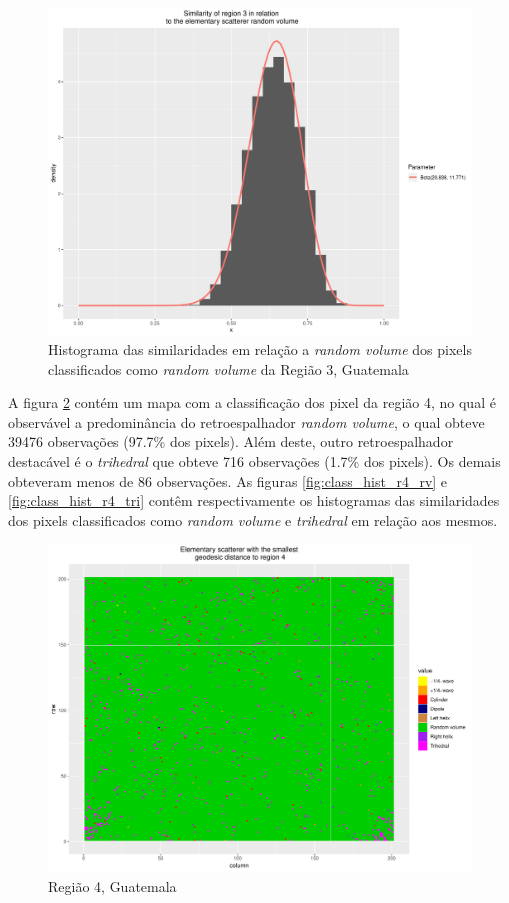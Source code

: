 \documentclass[12pt]{article}
\begin{document}
\begin{figure}[!h]
    \centering   
    \includegraphics[width = 0.8\linewidth]{../../Images/Report_18_12_20/Classifier_Geo_Dist/Histograms/Guate/region3_rv_sm_filter.pdf}
    \caption{Histograma das similaridades em relação a \textit{random volume} dos pixels classificados como \textit{random volume} da Região 3, Guatemala}
    \label{fig:class_hist_r3_rv}
\end{figure}

A figura \ref{fig:class_map_r4} contém um mapa com a classificação dos pixel da região 4, no qual é observável a predominância do retroespalhador \textit{random volume}, o qual obteve 39476 observações (97.7\% dos pixels). Além deste, outro retroespalhador destacável é o \textit{trihedral} que obteve 716 observações (1.7\% dos pixels). Os demais obteveram menos de 86 observações. As figuras \ref{fig:class_hist_r4_rv} e \ref{fig:class_hist_r4_tri} contêm respectivamente os histogramas das similaridades dos pixels classificados como \textit{random volume} e \textit{trihedral} em relação aos mesmos.

\begin{figure}[!h]
    \centering    
    \includegraphics[width = 0.8\linewidth]{../../Images/Report_18_12_20/Classifier_Geo_Dist/Class_Map/Guate/region4_predomain.pdf}
    \caption{Região 4, Guatemala}
    \label{fig:class_map_r4}
\end{figure}
\end{document}

